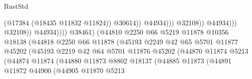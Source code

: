 \begin{lexlean}{RustStd}
\begin{coremodule}
                                                                    (@17384 (@18435 @11832 @11824))
                                                                    @30614))
                                                                @44934)))
                                                          @32108))
                                                      @44934)))
                                                @32108))
                                            @44934))))
                                    @38461)
                                  (@44810
                                    @2250
                                    @66
                                    @5219
                                    @11878
                                    @10356
                                    @18138
                                    (@44818
                                      @2250
                                      @66
                                      @11878
                                      (@45193
                                        @2249
                                        @42
                                        @65
                                        @5701
                                        @11877
                                        @45202
                                        (@45193
                                          @2219
                                          @42
                                          @64
                                          @5701
                                          @11876
                                          @45202
                                          (@44870
                                            @11874
                                            @5213
                                            (@44874
                                              @11874
                                              (@44880
                                                @11873
                                                @8802
                                                @18137
                                                (@44885
                                                  @11873
                                                  (@44891
                                                    @11872
                                                    @44900
                                                    (@44905
                                                      @11870
                                                      @5213

\end{coremodule}
\end{lexlean}
